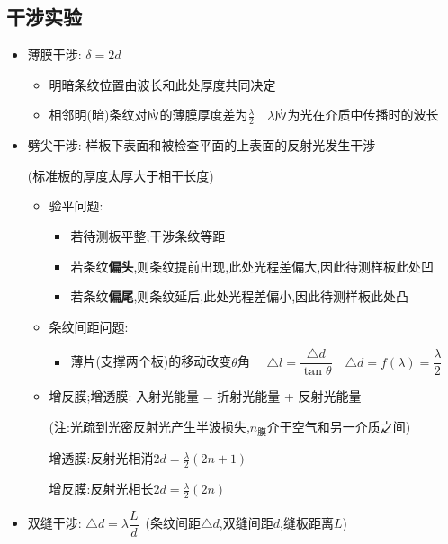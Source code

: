 \documentclass{article}
\begin{document}
\vspace{2em}

\subsection{干涉实验}
\begin{itemize}
    \item[] 薄膜干涉: $\delta = 2d$
        \begin{itemize}
            \item[] 明暗条纹位置由波长和此处厚度共同决定
            \item[] 相邻明(暗)条纹对应的薄膜厚度差为$\frac{\lambda}{2} \quad \lambda$应为光在介质中传播时的波长
        \end{itemize}
    \item[] 劈尖干涉: 样板下表面和被检查平面的上表面的反射光发生干涉

        \hspace{5em}(标准板的厚度太厚大于相干长度)

        \begin{itemize}
            \item[] 验平问题:
                \begin{itemize}
                    \item[] 若待测板平整,干涉条纹等距
                    \item[] 若条纹\textbf{偏头},则条纹提前出现,此处光程差偏大,因此待测样板此处凹
                    \item[] 若条纹\textbf{偏尾},则条纹延后,此处光程差偏小,因此待测样板此处凸
                \end{itemize}
            \item[] 条纹间距问题:
                \begin{itemize}
                    \item[] 薄片(支撑两个板)的移动改变$\theta$角 $\quad \triangle l = \dfrac{\triangle d}{\tan{\theta}} \quad
                            \triangle d = f(\lambda) = \dfrac{\lambda}{2}$
                \end{itemize}
            \item[] 增反膜;增透膜: 入射光能量 = 折射光能量 + 反射光能量

                \hspace{4em}(注:光疏到光密反射光产生半波损失,$n_{\text{膜}}$介于空气和另一介质之间)

                \hspace{4em}增透膜:反射光相消$2d = \frac{\lambda}{2} (2n+1)$

                \hspace{4em}增反膜:反射光相长$2d = \frac{\lambda}{2} (2n) $
        \end{itemize}

    \item[] 双缝干涉: $\triangle d = \lambda \dfrac{L}{d} \,$ (条纹间距$\triangle d $,双缝间距$d$,缝板距离$L$)
\end{itemize}
\end{document}
